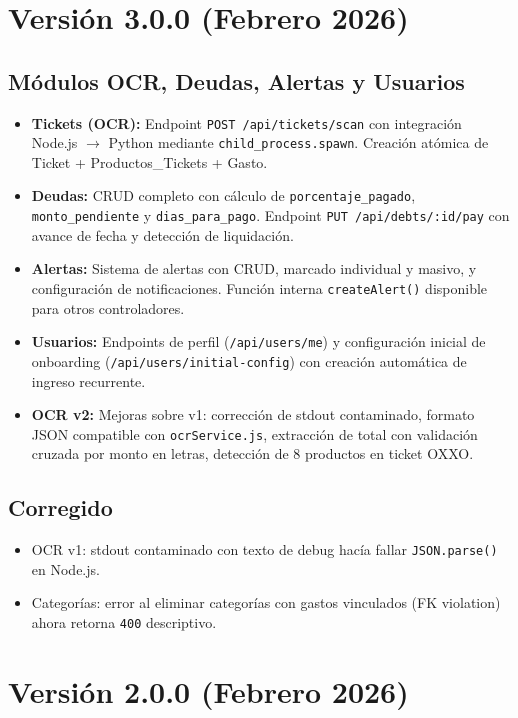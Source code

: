 \section{Versión 3.0.0 (Febrero 2026)}

\subsection*{Módulos OCR, Deudas, Alertas y Usuarios}

\begin{itemize}[leftmargin=1.5cm]
  \item \textbf{Tickets (OCR):} Endpoint \texttt{POST /api/tickets/scan} con integración Node.js $\to$ Python mediante \texttt{child\_process.spawn}. Creación atómica de Ticket + Productos\_Tickets + Gasto.
  \item \textbf{Deudas:} CRUD completo con cálculo de \texttt{porcentaje\_pagado}, \texttt{monto\_pendiente} y \texttt{dias\_para\_pago}. Endpoint \texttt{PUT /api/debts/:id/pay} con avance de fecha y detección de liquidación.
  \item \textbf{Alertas:} Sistema de alertas con CRUD, marcado individual y masivo, y configuración de notificaciones. Función interna \texttt{createAlert()} disponible para otros controladores.
  \item \textbf{Usuarios:} Endpoints de perfil (\texttt{/api/users/me}) y configuración inicial de onboarding (\texttt{/api/users/initial-config}) con creación automática de ingreso recurrente.
  \item \textbf{OCR v2:} Mejoras sobre v1: corrección de stdout contaminado, formato JSON compatible con \texttt{ocrService.js}, extracción de total con validación cruzada por monto en letras, detección de 8 productos en ticket OXXO.
\end{itemize}

\subsection*{Corregido}
\begin{itemize}[leftmargin=1.5cm]
  \item OCR v1: stdout contaminado con texto de debug hacía fallar \texttt{JSON.parse()} en Node.js.
  \item Categorías: error al eliminar categorías con gastos vinculados (FK violation) ahora retorna \texttt{400} descriptivo.
\end{itemize}

\section{Versión 2.0.0 (Febrero 2026)}

